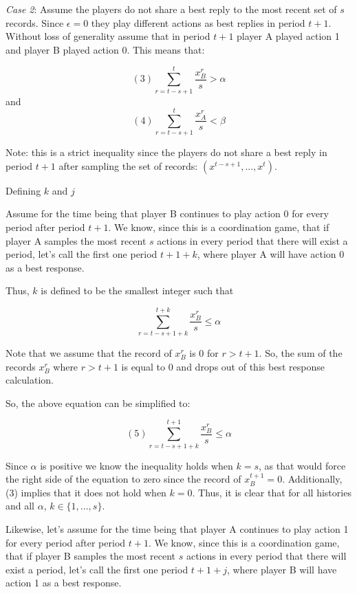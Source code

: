 \documentclass{article}
\begin{document}
\vskip24pt

\textit{Case 2}: Assume the players do not share a best reply to the most recent set of $s$ records. Since $\epsilon=0$ they play different actions as best replies in period $t+1$. Without loss of generality assume that in period $t+1$ player A played action 1 and player B played action 0. This means that:

$$(3) \sum\limits_{r=t-s+1}^{t} \frac{x^r_B}{s} > \alpha$$
and
$$(4) \sum\limits_{r=t-s+1}^{t} \frac{x^r_A}{s} < \beta$$

Note: this is a strict inequality since the players do not share a best reply in period $t+1$ after sampling the set of records: $(x^{t-s+1},...,x^{t})$.

\vskip12pt

\centering

Defining $k$ and $j$

\vskip6pt

\raggedright

Assume for the time being that player B continues to play action 0 for every period after period $t+1$. We know, since this is a coordination game, that if player A samples the most recent $s$ actions in every period that there will exist a period, let's call the first one period $t+1+k$, where player A will have action 0 as a best response.

\vskip12pt

Thus, $k$ is defined to be the smallest integer such that

$$ \sum\limits_{r=t-s+1+k}^{t+k} \frac{x^r_B}{s} \leq \alpha$$

Note that we assume that the record of $x^r_B$ is 0 for $r > t+1$. So, the sum of the records $x^r_B$ where $r > t+1$ is equal to 0 and drops out of this best response calculation. 

So, the above equation can be simplified to:

$$ (5) \sum\limits_{r=t-s+1+k}^{t+1} \frac{x^r_B}{s} \leq \alpha$$


Since $\alpha$ is positive we know the inequality holds when $k=s$, as that would force the right side of the equation to zero since the record of $x^{t+1}_B = 0$. Additionally, (3) implies that it does not hold when $k=0$. Thus, it is clear that for all histories and all $\alpha$, $k \in \{1,...,s\}$.

\vskip12pt

Likewise, let's assume for the time being that player A continues to play action 1 for every period after period $t+1$. We know, since this is a coordination game, that if player B samples the most recent $s$ actions in every period that there will exist a period, let's call the first one period $t+1+j$, where player B will have action 1 as a best response.
\end{document}
